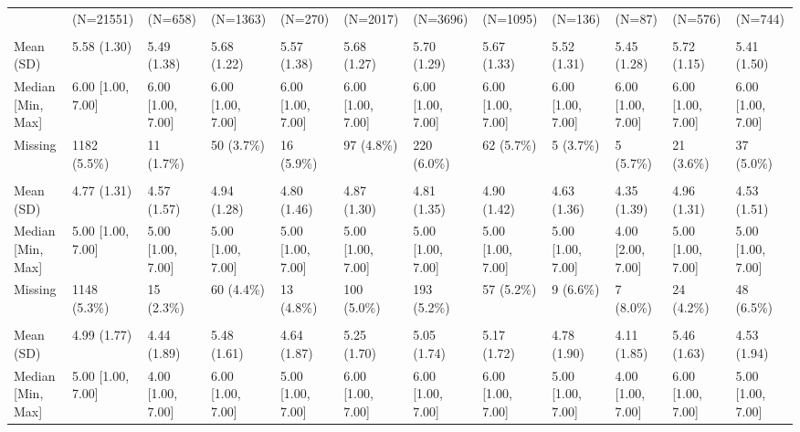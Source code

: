 \documentclass[
  single column]{article}
\begin{document}
\begin{landscape}
\begin{longtable}[t]{llllllllllll}
\endfoot
\bottomrule
\endlastfoot
 & (N=21551) & (N=658) & (N=1363) & (N=270) & (N=2017) & (N=3696) & (N=1095) & (N=136) & (N=87) & (N=576) & (N=744)\\
\addlinespace[0.3em]
\multicolumn{12}{l}{\textbf{Belonging - Acceptance}}\\
\hspace{1em}Mean (SD) & 5.58 (1.30) & 5.49 (1.38) & 5.68 (1.22) & 5.57 (1.38) & 5.68 (1.27) & 5.70 (1.29) & 5.67 (1.33) & 5.52 (1.31) & 5.45 (1.28) & 5.72 (1.15) & 5.41 (1.50)\\
\hspace{1em}Median [Min, Max] & 6.00 [1.00, 7.00] & 6.00 [1.00, 7.00] & 6.00 [1.00, 7.00] & 6.00 [1.00, 7.00] & 6.00 [1.00, 7.00] & 6.00 [1.00, 7.00] & 6.00 [1.00, 7.00] & 6.00 [1.00, 7.00] & 6.00 [1.00, 7.00] & 6.00 [1.00, 7.00] & 6.00 [1.00, \vphantom{2} 7.00]\\
\hspace{1em}Missing & 1182 (5.5\%) & 11 (1.7\%) & 50 (3.7\%) & 16 (5.9\%) & 97 (4.8\%) & 220 (6.0\%) & 62 (5.7\%) & 5 (3.7\%) & 5 (5.7\%) & 21 (3.6\%) & 37 (5.0\%)\\
\addlinespace[0.3em]
\multicolumn{12}{l}{\textbf{Belonging - Shared Beliefs}}\\
\hspace{1em}Mean (SD) & 4.77 (1.31) & 4.57 (1.57) & 4.94 (1.28) & 4.80 (1.46) & 4.87 (1.30) & 4.81 (1.35) & 4.90 (1.42) & 4.63 (1.36) & 4.35 (1.39) & 4.96 (1.31) & 4.53 (1.51)\\
\hspace{1em}Median [Min, Max] & 5.00 [1.00, 7.00] & 5.00 [1.00, 7.00] & 5.00 [1.00, 7.00] & 5.00 [1.00, 7.00] & 5.00 [1.00, 7.00] & 5.00 [1.00, 7.00] & 5.00 [1.00, 7.00] & 5.00 [1.00, 7.00] & 4.00 [2.00, 7.00] & 5.00 [1.00, 7.00] & 5.00 [1.00, 7.00]\\
\hspace{1em}Missing & 1148 (5.3\%) & 15 (2.3\%) & 60 (4.4\%) & 13 (4.8\%) & 100 (5.0\%) & 193 (5.2\%) & 57 (5.2\%) & 9 (6.6\%) & 7 (8.0\%) & 24 (4.2\%) & 48 (6.5\%)\\
\addlinespace[0.3em]
\multicolumn{12}{l}{\textbf{Belonging - Outsider (Reversed)}}\\
\hspace{1em}Mean (SD) & 4.99 (1.77) & 4.44 (1.89) & 5.48 (1.61) & 4.64 (1.87) & 5.25 (1.70) & 5.05 (1.74) & 5.17 (1.72) & 4.78 (1.90) & 4.11 (1.85) & 5.46 (1.63) & 4.53 (1.94)\\
\hspace{1em}Median [Min, Max] & 5.00 [1.00, 7.00] & 4.00 [1.00, 7.00] & 6.00 [1.00, 7.00] & 5.00 [1.00, 7.00] & 6.00 [1.00, 7.00] & 6.00 [1.00, 7.00] & 6.00 [1.00, 7.00] & 5.00 [1.00, 7.00] & 4.00 [1.00, 7.00] & 6.00 [1.00, 7.00] & 5.00 [1.00, 7.00]\\

\end{longtable}
\end{landscape}
\end{document}

